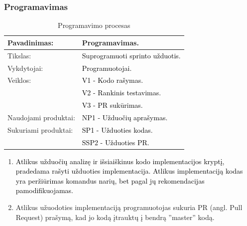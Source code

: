 \documentclass{VUMIFPSkursinis}
\begin{document}
	\subsubsection{Programavimas}
	\begin{center}
		\begin{table}[ht]
			\caption{Programavimo procesas}
			\begin{tabular}{ | l | l | }
				\hline
				Pavadinimas:         & Programavimas.                                     \\ \hline
				Tikslas:             & \textcolor{black}{Suprogramuoti sprinto užduotis.}	\\ \hline
				Vykdytojai:          & \textcolor{black}{Programuotojai.}                 \\ \hline
				Veiklos:             & \textcolor{black}{V1 - Kodo rašymas.}              \\
				                     & \textcolor{black}{V2 - Rankinis testavimas.}       \\
				                     & \textcolor{black}{V3 - PR sukūrimas.}              \\ \hline
				Naudojami produktai: & \textcolor{black}{NP1 - Užduočių aprašymas.}       \\ \hline
				Sukuriami produktai: & \textcolor{black}{SP1 - Užduoties kodas.}          \\
				                     & \textcolor{black}{SSP2 - Užduoties PR.}            \\ \hline
			\end{tabular}
		\end{table}
	\end{center}
		\begin{enumerate}
			\item{
				\textcolor{black}{Atlikus užduočių analizę ir išsiaiškinus kodo implementacijos kryptį, pradedama rašyti užduoties implementacija.
				Atlikus implementaciją kodas yra peržiūrimas komandus narių, bet pagal jų rekomendacijas pamodifikuojamas.}
			}
			\item{Atlikus užuodoties implementaciją programuotojas sukuria PR (angl. Pull Request) prašymą, kad jo kodą įtrauktų į bendrą ''master'' kodą.}
		\end{enumerate}
\end{document}
